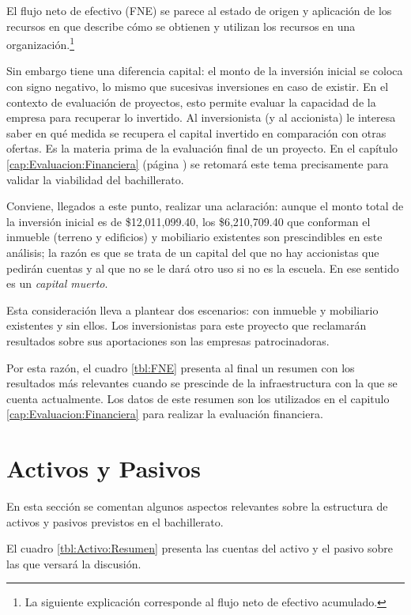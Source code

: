 El flujo neto de efectivo (FNE) se parece al estado de origen y aplicación de los recursos en que describe cómo se obtienen y utilizan los recursos en una organización.\footnote{La siguiente explicación corresponde al flujo neto de efectivo acumulado.}

Sin embargo tiene una diferencia capital: el monto de la inversión inicial se coloca con signo negativo, lo mismo que sucesivas inversiones en caso de existir. En el contexto de evaluación de proyectos, esto permite evaluar la capacidad de la empresa para recuperar lo invertido. Al inversionista (y al accionista) le interesa saber en qué medida se recupera el capital invertido en comparación con otras ofertas. Es la materia prima de la evaluación final de un proyecto. En el capítulo \ref{cap:Evaluacion:Financiera} (página \pageref{cap:Evaluacion:Financiera}) se retomará este tema precisamente para validar la viabilidad del bachillerato.

Conviene, llegados a este punto, realizar una aclaración: aunque el monto total de la inversión inicial es de \$12,011,099.40, los \$6,210,709.40 que conforman el inmueble (terreno y edificios) y mobiliario existentes son prescindibles en este análisis; la razón es que se trata de un capital del que no hay accionistas que pedirán cuentas y al que no se le dará otro uso si no es la escuela. En ese sentido es un \emph{capital muerto}.

Esta consideración lleva a plantear dos escenarios: con inmueble y mobiliario existentes y sin ellos. Los inversionistas para este proyecto que reclamarán resultados sobre sus aportaciones son las empresas patrocinadoras.

Por esta razón, el cuadro \ref{tbl:FNE} presenta al final un resumen con los resultados más relevantes cuando se prescinde de la infraestructura con la que se cuenta actualmente. Los datos de este resumen son los utilizados en el capitulo \ref{cap:Evaluacion:Financiera} para realizar la evaluación financiera.



\section{Activos y Pasivos}
\label{sec:ActivosPasivos}

En esta sección se comentan algunos aspectos relevantes sobre la estructura de activos y pasivos previstos en el bachillerato.

El cuadro \ref{tbl:Activo:Resumen} presenta las cuentas del activo y el pasivo sobre las que versará la discusión.

